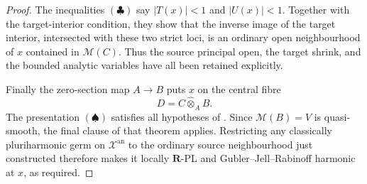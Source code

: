 \begin{proof}
The inequalities \((\clubsuit)\) say \(|T(x)|<1\) and \(|U(x)|<1\).
Together with the target-interior condition, they show that the inverse
image of the target interior, intersected with these two strict loci, is an
ordinary open neighbourhood of \(x\) contained in \(\mathcal M(C)\).
Thus the source principal open, the target shrink, and the bounded analytic
variables have all been retained explicitly.

Finally the zero-section map \(A\to B\) puts \(x\) on the central fibre
\[
                         D=C\widehat\otimes_A B.
\]
The presentation \((\spadesuit)\) satisfies all hypotheses of
.  Since
\(\mathcal M(B)=V\) is quasi-smooth, the final clause of that theorem
applies.  Restricting any classically pluriharmonic germ on
\(\mathcal X^{\mathrm{an}}\) to the ordinary source neighbourhood just constructed
therefore makes it locally \(\mathbf R\)-PL and Gubler--Jell--Rabinoff
harmonic at \(x\), as required.
\end{proof}
